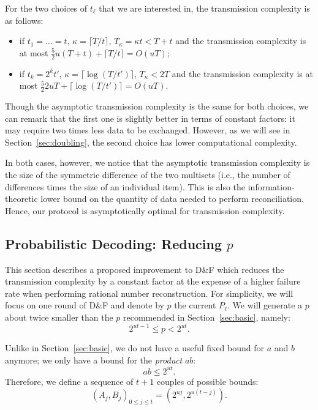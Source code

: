 \documentclass[11pt]{llncs}
\newcommand{\df}{D\&F\xspace}
\begin{document}
For the two choices of $t_\ell$ that we are interested in, the transmission complexity is as follows:
\begin{itemize}
\item if $t_1 = \dots = t$, $\kappa = \lceil T/t \rceil$, $T_\kappa = \kappa t < T+t$ and the transmission complexity is at most $\frac{5}{2} u (T+t) + \lceil T/t \rceil = O(uT)$;
\item if $t_k = 2^k t'$, $\kappa = \lceil \log(T/t') \rceil$, $T_\kappa < 2T$ and the transmission complexity is at most $\frac{5}{2} 2uT + \lceil \log(T/t') \rceil = O(uT)$.
\end{itemize}
Though the asymptotic transmission complexity is the same for both choices, we can remark that the first one is slightly better in terms of constant factors: it may require two times less data to be exchanged.
However, as we will see in Section~\ref{sec:doubling}, the second choice has lower computational complexity.

In both cases, however, we notice that the asymptotic transmission complexity is the size of the symmetric difference of the two multisets (i.e., the number of differences times the size of an individual item). This is also the information-theoretic lower bound on the quantity of data needed to perform reconciliation. Hence, our protocol is asymptotically optimal for transmission complexity.

\subsection{Probabilistic Decoding: Reducing $p$}
\label{sec:probabilistic}

This section describes a proposed improvement to \df which reduces the transmission complexity by a constant factor at the expense of a higher failure rate when performing rational number reconstruction. For simplicity, we will focus on one round of \df and denote by $p$ the current $P_\ell$. We will generate a $p$ about twice smaller than the $p$ recommended in Section~\ref{sec:basic}, namely:
\begin{equation}
\label{eq:eqnewp}
2^{ut-1}\leq p < 2^{ut}.
\end{equation}

Unlike in Section~\ref{sec:basic}, we do not have a useful fixed bound for $a$ and $b$ anymore; we only have a bound for the \textit{product} $a b$: 
\begin{equation}
\label{eq:eqab}
ab \leq 2^{ut}.
\end{equation} 
Therefore, we define a sequence of $t+1$ couples of possible bounds:
\[\left(A_j, B_j\right)_{0 \leq j \leq t} = \left(2^{uj}, 2^{u(t-j)}\right). \]
\end{document}
